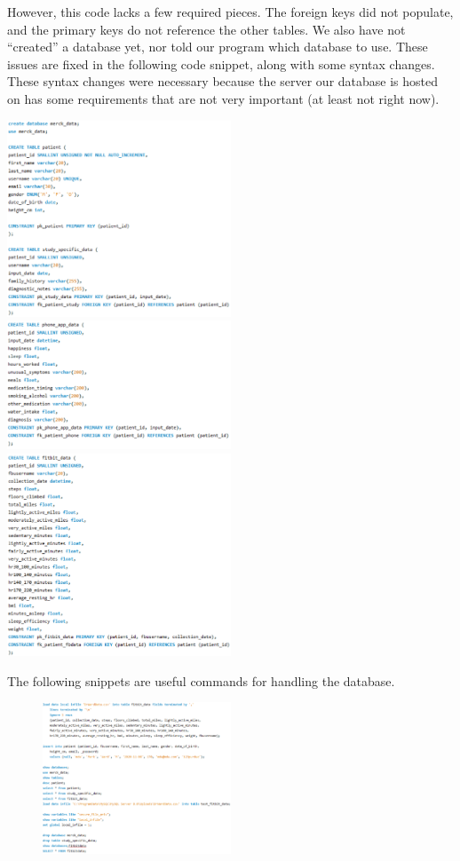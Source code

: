 \documentclass[]{book}
\begin{document}
However, this code lacks a few required pieces. The foreign keys did not
populate, and the primary keys do not reference the other tables. We
also have not ``created'' a database yet, nor told our program which
database to use. These issues are fixed in the following code snippet,
along with some syntax changes. These syntax changes were necessary
because the server our database is hosted on has some requirements that
are not very important (at least not right now).

\includegraphics[width=0.50000\textwidth]{./images/a3.png}
\includegraphics[width=0.50000\textwidth]{./images/a4.png}
\includegraphics[width=0.50000\textwidth]{./images/a5.png}

The following snippets are useful commands for handling the database.

\begin{figure}
\centering
\includegraphics[width=0.50000\textwidth]{./images/a6.png}
\caption{}
\end{figure}
\end{document}
